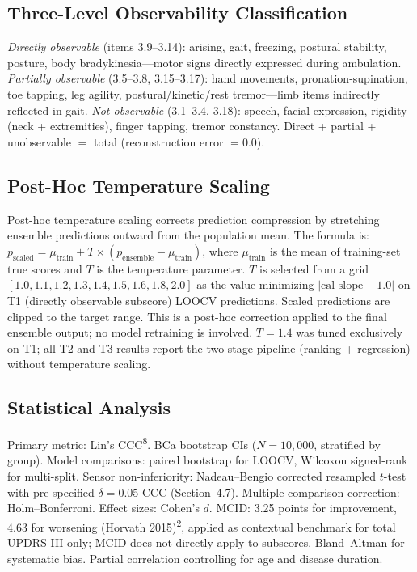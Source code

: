 \documentclass[11pt,a4paper]{article}
\begin{document}
\subsection{Three-Level Observability Classification}

\emph{Directly observable} (items 3.9--3.14): arising, gait, freezing, postural stability, posture, body bradykinesia---motor signs directly expressed during ambulation. \emph{Partially observable} (3.5--3.8, 3.15--3.17): hand movements, pronation-supination, toe tapping, leg agility, postural/kinetic/rest tremor---limb items indirectly reflected in gait. \emph{Not observable} (3.1--3.4, 3.18): speech, facial expression, rigidity (neck + extremities), finger tapping, tremor constancy. Direct + partial + unobservable $=$ total (reconstruction error $=0.0$).

\subsection{Post-Hoc Temperature Scaling}

Post-hoc temperature scaling corrects prediction compression by stretching ensemble predictions outward from the population mean. The formula is: $p_{\mathrm{scaled}} = \mu_{\mathrm{train}} + T \times (p_{\mathrm{ensemble}} - \mu_{\mathrm{train}})$, where $\mu_{\mathrm{train}}$ is the mean of training-set true scores and $T$ is the temperature parameter. $T$ is selected from a grid $[1.0, 1.1, 1.2, 1.3, 1.4, 1.5, 1.6, 1.8, 2.0]$ as the value minimizing $|\text{cal\_slope} - 1.0|$ on T1 (directly observable subscore) LOOCV predictions. Scaled predictions are clipped to the target range. This is a post-hoc correction applied to the final ensemble output; no model retraining is involved. $T=1.4$ was tuned exclusively on T1; all T2 and T3 results report the two-stage pipeline (ranking + regression) without temperature scaling.

\subsection{Statistical Analysis}

Primary metric: Lin's CCC\textsuperscript{8}. BCa bootstrap CIs ($N=10{,}000$, stratified by group). Model comparisons: paired bootstrap for LOOCV, Wilcoxon signed-rank for multi-split. Sensor non-inferiority: Nadeau--Bengio corrected resampled $t$-test with pre-specified $\delta=0.05$ CCC (Section~4.7). Multiple comparison correction: Holm--Bonferroni. Effect sizes: Cohen's $d$. MCID: 3.25 points for improvement, 4.63 for worsening (Horvath 2015)\textsuperscript{2}, applied as contextual benchmark for total UPDRS-III only; MCID does not directly apply to subscores. Bland--Altman for systematic bias. Partial correlation controlling for age and disease duration.
\end{document}
